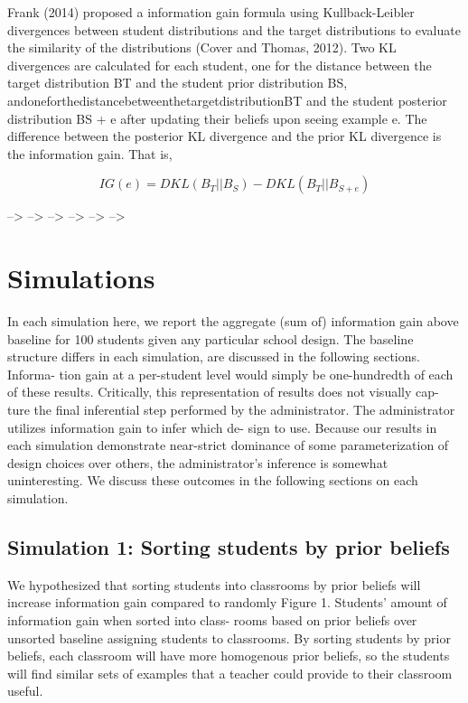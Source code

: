 \documentclass[10pt, letterpaper]{article}
\begin{document}
Frank (2014) proposed a information gain formula using Kullback-Leibler
divergences between student distributions and the target distributions
to evaluate the similarity of the distributions (Cover and Thomas,
2012). Two KL divergences are calculated for each student, one for the
distance between the target distribution BT and the student prior
distribution BS, andoneforthedistancebetweenthetargetdistributionBT and
the student posterior distribution BS + e after updating their beliefs
upon seeing example e. The difference between the posterior KL
divergence and the prior KL divergence is the information gain. That is,

\[IG(e) = DKL(B_T ||B_S) − DKL(B_T ||B_{S+e})\]

--\textgreater{} --\textgreater{} --\textgreater{} --\textgreater{}
--\textgreater{} --\textgreater{}

\section{Simulations}\label{simulations}

In each simulation here, we report the aggregate (sum of) information
gain above baseline for 100 students given any particular school design.
The baseline structure differs in each simulation, are discussed in the
following sections. Informa- tion gain at a per-student level would
simply be one-hundredth of each of these results. Critically, this
representation of results does not visually cap- ture the final
inferential step performed by the administrator. The administrator
utilizes information gain to infer which de- sign to use. Because our
results in each simulation demonstrate near-strict dominance of some
parameterization of design choices over others, the administrator's
inference is somewhat uninteresting. We discuss these outcomes in the
following sections on each simulation.

\subsection{Simulation 1: Sorting students by prior
beliefs}\label{simulation-1-sorting-students-by-prior-beliefs}

We hypothesized that sorting students into classrooms by prior beliefs
will increase information gain compared to randomly Figure 1. Students'
amount of information gain when sorted into class- rooms based on prior
beliefs over unsorted baseline assigning students to classrooms. By
sorting students by prior beliefs, each classroom will have more
homogenous prior beliefs, so the students will find similar sets of
examples that a teacher could provide to their classroom useful.
\end{document}

